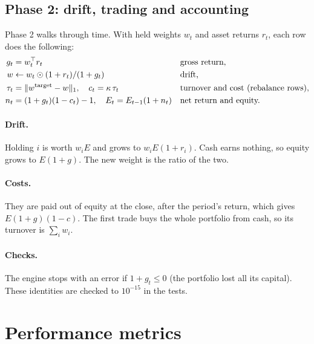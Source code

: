 \documentclass[11pt,a4paper]{article}
\makeatletter
\newcommand{\snippetsource}[1]{\csname snippet@#1\endcsname}
\newcommand{\snippet}[3]{%
  }
\makeatother
\begin{document}
\subsection{Phase 2: drift, trading and accounting}
Phase 2 walks through time. With held weights $w_t$ and asset returns $r_t$, each row does
the following:
\begin{align*}
  g_t&=w_t^\top r_t &&\text{gross return,}\\
  w&\leftarrow w_t\odot(1+r_t)/(1+g_t) &&\text{drift,}\\
  \tau_t&=\lVert w^{\text{target}}-w\rVert_1,\quad c_t=\kappa\,\tau_t &&\text{turnover and cost (rebalance rows),}\\
  n_t&=(1+g_t)(1-c_t)-1,\quad E_t=E_{t-1}(1+n_t) &&\text{net return and equity.}
\end{align*}
\paragraph{Drift.} Holding $i$ is worth $w_iE$ and grows to $w_iE(1+r_i)$. Cash earns
nothing, so equity grows to $E(1+g)$. The new weight is the ratio of the two.

\paragraph{Costs.} They are paid out of equity at the close, after the period's return,
which gives $E(1+g)(1-c)$. The first trade buys the whole portfolio from cash, so its
turnover is $\sum_iw_i$.

\paragraph{Checks.} The engine stops with an error if $1+g_t\le0$ (the portfolio lost all
its capital). These identities are checked to $10^{-15}$ in the tests.
\snippet{engine_phase2}{C++}{Phase 2}

\section{Performance metrics}\label{sec:metrics}
\end{document}
